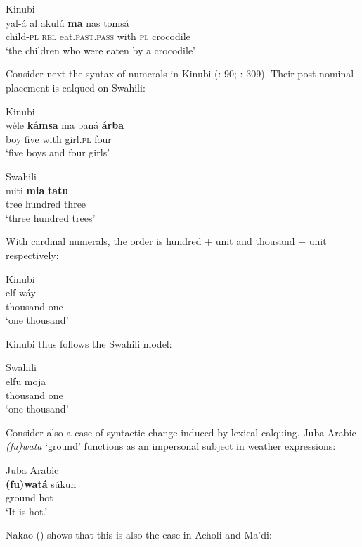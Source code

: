 \documentclass[output=paper]{langsci/langscibook}
\begin{document}
\ea
{       Kinubi \citep[230]{Luffin2005}}\\
\gll yal-á al akulú \textbf{ma} nas tomsá\\
     child-\textsc{pl} \textsc{rel} eat.\textsc{past.pass} with \textsc{pl} crocodile\\
\glt     `the children who were eaten by a crocodile'
\z

Consider next the syntax of numerals in Kinubi (\citealt{Wellens2003}: 90; \citealt{Luffin2014}: 309). Their post-nominal placement is calqued on Swahili:

\ea
{Kinubi \citep[309]{Luffin2014}}\\
\gll wéle \textbf{kámsa} ma baná \textbf{árba}\\
     boy five with girl.\textsc{pl} four\\
\glt     `five boys and four girls'
\z

\ea
{Swahili \citep[309]{Luffin2014}}\\
\gll miti \textbf{mia} \textbf{tatu}\\
     tree hundred three\\
\glt     `three hundred trees'
\z

With cardinal numerals, the order is hundred + unit and thousand + unit respectively:

 

 \ea
{Kinubi \citep[309]{Luffin2014}}\\

\gll   elf wáy\\
       thousand one\\
\glt      `one thousand'
\z

Kinubi thus follows the Swahili model:

\ea
{Swahili \citep[309]{Luffin2014}}\\
\gll            elfu moja \\
                thousand one \\
\glt     `one thousand'
\z

Consider also a case of syntactic change induced by lexical calquing. Juba Arabic \textit{(fu)wata} ‘ground’ functions as an impersonal subject in weather expressions:

\ea
{Juba Arabic \citep[141]{Nakao2012}}\\
\gll   \textbf{(fu)watá} súkun\\
       ground hot\\
\glt     `It is hot.'
\z

Nakao (\citeyear[141]{Nakao2012}) shows that this is also the case in Acholi and Ma'di:
\end{document}
